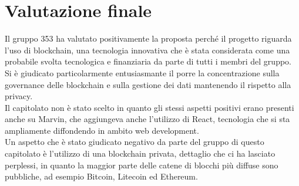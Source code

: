\documentclass[main.tex]{subfiles}
\begin{document}
\section{Valutazione finale}
Il gruppo 353 ha valutato positivamente la proposta perché il progetto riguarda l'uso di blockchain, una tecnologia innovativa che è stata considerata come una probabile svolta tecnologica e finanziaria da parte di tutti i membri del gruppo.\\
Si è giudicato particolarmente entusiasmante il porre la concentrazione sulla governance delle blockchain e sulla gestione dei dati mantenendo il rispetto alla privacy.\\
Il capitolato non è stato scelto in quanto gli stessi aspetti positivi erano presenti anche su Marvin, che aggiungeva anche l'utilizzo di React, tecnologia che si sta ampliamente diffondendo in ambito web development.\\
Un aspetto che è stato giudicato negativo da parte del gruppo di questo capitolato è l'utilizzo di una blockchain privata, dettaglio che ci ha lasciato perplessi, in quanto la maggior parte delle catene di blocchi più diffuse sono pubbliche, ad esempio Bitcoin, Litecoin ed Ethereum.
\end{document}
